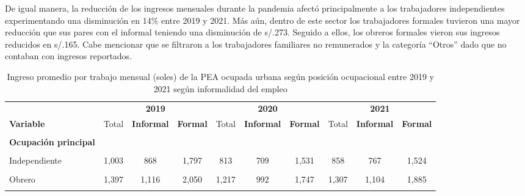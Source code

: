 \documentclass[
  letterpaper,
  12pt,
  oneside,
  spanish,
  doublespacing,
  headsepline,
  parskip]{MastersDoctoralThesis}
\begin{document}
De igual manera, la reducción de los ingresos mensuales durante la
pandemia afectó principalmente a los trabajadores independientes
experimentando una disminución en 14\% entre 2019 y 2021. Más aún,
dentro de este sector los trabajadores formales tuvieron una mayor
reducción que sus pares con el informal teniendo una disminución de
s/.273. Seguido a ellos, los obreros formales vieron sus ingresos
reducidos en s/.165. Cabe mencionar que se filtraron a los trabajadores
familiares no remunerados y la categoría ``Otros'' dado que no contaban
con ingresos reportados.

\hypertarget{tbl-ing_p507}{}
\begin{table}[H]
\caption{\label{tbl-ing_p507}Ingreso promedio por trabajo mensual (soles) de la PEA ocupada urbana
según posición ocupacional entre 2019 y 2021 según informalidad del
empleo }\tabularnewline

\centering\begingroup\fontsize{9}{11}\selectfont

\begin{tabular}{lccccccccc}
\toprule
\multicolumn{1}{c}{ } & \multicolumn{3}{c}{\textbf{2019}} & \multicolumn{3}{c}{\textbf{2020}} & \multicolumn{3}{c}{\textbf{2021}} \\
\cmidrule(l{3pt}r{3pt}){2-4} \cmidrule(l{3pt}r{3pt}){5-7} \cmidrule(l{3pt}r{3pt}){8-10}
\textbf{Variable} & Total & \textbf{Informal} & \textbf{Formal} & Total & \textbf{Informal} & \textbf{Formal} & Total & \textbf{Informal} & \textbf{Formal}\\
\midrule
\cellcolor{gray!6}{\textbf{Nacional}} & \cellcolor{gray!6}{1,595} & \cellcolor{gray!6}{1,037} & \cellcolor{gray!6}{2,599} & \cellcolor{gray!6}{1,407} & \cellcolor{gray!6}{901} & \cellcolor{gray!6}{2,380} & \cellcolor{gray!6}{1,443} & \cellcolor{gray!6}{989} & \cellcolor{gray!6}{2,473}\\
\textbf{Ocupación principal} &  &  &  &  &  &  &  &  & \\
\cellcolor{gray!6}{Empleador} & \cellcolor{gray!6}{2,801} & \cellcolor{gray!6}{1,926} & \cellcolor{gray!6}{3,538} & \cellcolor{gray!6}{2,533} & \cellcolor{gray!6}{1,802} & \cellcolor{gray!6}{3,187} & \cellcolor{gray!6}{2,662} & \cellcolor{gray!6}{1,960} & \cellcolor{gray!6}{3,386}\\
Independiente & 1,003 & 868 & 1,797 & 813 & 709 & 1,531 & 858 & 767 & 1,524\\
\cellcolor{gray!6}{Empleado} & \cellcolor{gray!6}{2,288} & \cellcolor{gray!6}{1,229} & \cellcolor{gray!6}{2,900} & \cellcolor{gray!6}{2,260} & \cellcolor{gray!6}{1,240} & \cellcolor{gray!6}{2,784} & \cellcolor{gray!6}{2,252} & \cellcolor{gray!6}{1,288} & \cellcolor{gray!6}{2,886}\\
\addlinespace
Obrero & 1,397 & 1,116 & 2,050 & 1,217 & 992 & 1,747 & 1,307 & 1,104 & 1,885\\
\cellcolor{gray!6}{Trabajador del Hogar} & \cellcolor{gray!6}{1,063} & \cellcolor{gray!6}{982} & \cellcolor{gray!6}{1,657} & \cellcolor{gray!6}{985} & \cellcolor{gray!6}{908} & \cellcolor{gray!6}{1,476} & \cellcolor{gray!6}{1,057} & \cellcolor{gray!6}{1,006} & \cellcolor{gray!6}{1,633}\\
\bottomrule
\end{tabular}
\endgroup{}
\end{table}
\end{document}
